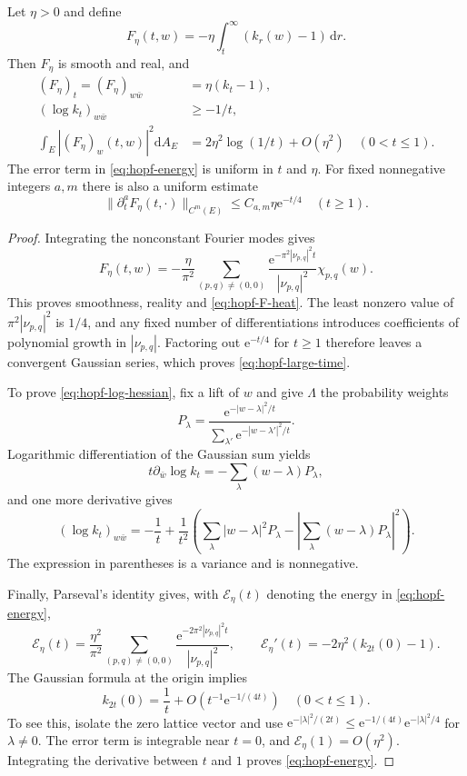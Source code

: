 \begin{lemma}\label{lem:hopf-fiber-potential}
Let $\eta>0$ and define
\[
 F_\eta(t,w)=-\eta\int_t^\infty(k_r(w)-1)\,\mathrm{d}r.
\]
Then $F_\eta$ is smooth and real, and
\begin{align}
 (F_\eta)_t=(F_\eta)_{w\bar w}
   &=\eta(k_t-1),\label{eq:hopf-F-heat}\\
 (\log k_t)_{w\bar w}&\geq-1/t,\label{eq:hopf-log-hessian}\\
 \int_E|(F_\eta)_w(t,w)|^2\mathrm{d}A_E
   &=2\eta^2\log(1/t)+O(\eta^2)\quad(0<t\leq1).
   \label{eq:hopf-energy}
\end{align}
The error term in \eqref{eq:hopf-energy} is uniform in $t$ and $\eta$. For fixed nonnegative integers $a,m$ there is also a uniform estimate
\begin{equation}\label{eq:hopf-large-time}
 \|\partial_t^aF_\eta(t,\cdot)\|_{C^m(E)}
 \leq C_{a,m}\eta \mathrm{e}^{-t/4}\quad(t\geq1).
\end{equation}
\end{lemma}
\begin{proof}
Integrating the nonconstant Fourier modes gives
\[
 F_\eta(t,w)=-\frac{\eta}{\pi^2}
 \sum_{(p,q)\ne(0,0)}
 \frac{\mathrm{e}^{-\pi^2|\nu_{p,q}|^2t}}{|\nu_{p,q}|^2}\chi_{p,q}(w).
\]
This proves smoothness, reality and \eqref{eq:hopf-F-heat}. The least nonzero value of $\pi^2|\nu_{p,q}|^2$ is $1/4$, and any fixed number of differentiations introduces coefficients of polynomial growth in $|\nu_{p,q}|$. Factoring out $\mathrm{e}^{-t/4}$ for $t\geq1$ therefore leaves a convergent Gaussian series, which proves \eqref{eq:hopf-large-time}.

To prove \eqref{eq:hopf-log-hessian}, fix a lift of $w$ and give $\Lambda$ the probability weights
\[
 P_\lambda=
 \frac{\mathrm{e}^{-|w-\lambda|^2/t}}
      {\sum_{\lambda'}\mathrm{e}^{-|w-\lambda'|^2/t}}.
\]
Logarithmic differentiation of the Gaussian sum yields
\[
 t\partial_{\bar w}\log k_t=-\sum_\lambda(w-\lambda)P_\lambda,
\]
and one more derivative gives
\[
 (\log k_t)_{w\bar w}
 =-\frac1t+\frac1{t^2}
 \left(\sum_\lambda|w-\lambda|^2P_\lambda
       -\left|\sum_\lambda(w-\lambda)P_\lambda\right|^2\right).
\]
The expression in parentheses is a variance and is nonnegative.

Finally, Parseval's identity gives, with $\mathcal E_\eta(t)$ denoting the energy in \eqref{eq:hopf-energy},
\[
 \mathcal E_\eta(t)=\frac{\eta^2}{\pi^2}
   \sum_{(p,q)\ne(0,0)}
   \frac{\mathrm{e}^{-2\pi^2|\nu_{p,q}|^2t}}{|\nu_{p,q}|^2},
 \qquad
 \mathcal E_\eta'(t)=-2\eta^2(k_{2t}(0)-1).
\]
The Gaussian formula at the origin implies
\[
 k_{2t}(0)=\frac1t+
    O\left(t^{-1}\mathrm{e}^{-1/(4t)}\right)\quad(0<t\leq1).
\]
To see this, isolate the zero lattice vector and use
$\mathrm{e}^{-|\lambda|^2/(2t)}\leq \mathrm{e}^{-1/(4t)}\mathrm{e}^{-|\lambda|^2/4}$ for $\lambda\ne0$. The error term is integrable near $t=0$, and $\mathcal E_\eta(1)=O(\eta^2)$. Integrating the derivative between $t$ and $1$ proves \eqref{eq:hopf-energy}.
\end{proof}

